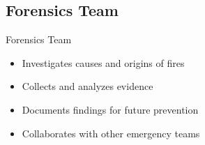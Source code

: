 \subsection{Forensics Team}
\begin{frame}{Forensics Team}
    \begin{itemize}
        \item Investigates causes and origins of fires
        \item Collects and analyzes evidence
        \item Documents findings for future prevention
        \item Collaborates with other emergency teams
    \end{itemize}
\end{frame} 